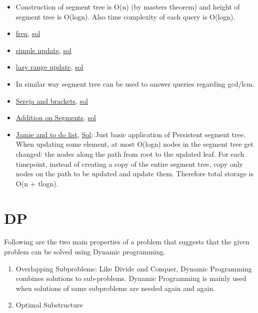 \documentclass[8pt, a4paper, oneside, twocolumn]{extarticle}
\begin{document}
\begin{itemize}
    \item Construction of segment tree is O(n) (by masters theorem) and height of segment tree is O(logn). Also time complexity of each query is O(logn).
    \item \href{https://uva.onlinejudge.org/external/112/11235.pdf}{freq}, \href{https://gist.github.com/sourabhxyz/adf33f80e4b1e95bdb7d7a0e28ae23e6}{sol}
    \item \href{https://uva.onlinejudge.org/external/112/11297.pdf}{simple update}, \href{https://gist.github.com/sourabhxyz/1376c934be55a72ca3f7c6f7481125ca}{sol}
    \item \href{https://uva.onlinejudge.org/external/114/11402.pdf}{lazy range update}, \href{https://github.com/sourabhxyz/Competitive-Programming/blob/master/UVA_11402.cpp}{sol}
    \item In similar way segment tree can be used to answer queries regarding gcd/lcm.
    \item \href{https://codeforces.com/problemset/problem/380/C}{Sereja and brackets}, \href{https://github.com/sourabhxyz/Competitive-Programming/blob/master/CF/Data%20Structures/Segment%20Tree/380C%20-%20Seraja%20And%20Brackets.cpp}{sol}
    \item \href{https://codeforces.com/problemset/problem/981/E}{Addition on Segments}, \href{https://github.com/sourabhxyz/Competitive-Programming/blob/master/CF/Data%20Structures/Segment%20Tree/Problem%20-%20E%20Addition%20On%20Segments_sol_tourist.cpp}{sol}
    \item \href {https://codeforces.com/contest/916/problem/D}{Jamie and to do list}, \href {https://github.com/sourabhxyz/Competitive-Programming/blob/master/CF/457D2/D.cpp}{Sol}: Just basic application of Persistent segment tree. When updating some element, at most O(logn) nodes in the segment tree get changed: the nodes along the path from root to the updated leaf. For each timepoint, instead of creating a copy of the entire segment tree, copy only nodes on the path to be updated and update them. Therefore total storage is O(n + t\*logn).
\end{itemize}
\section{DP}
Following are the two main properties of a problem that suggests that the given problem can be solved using Dynamic programming.
\begin{enumerate}
    \item Overlapping Subproblems: Like Divide and Conquer, Dynamic Programming combines solutions to sub-problems. Dynamic Programming is mainly used when solutions of same subproblems are needed again and again.
    \item Optimal Substructure
\end{enumerate}
\end{document}
